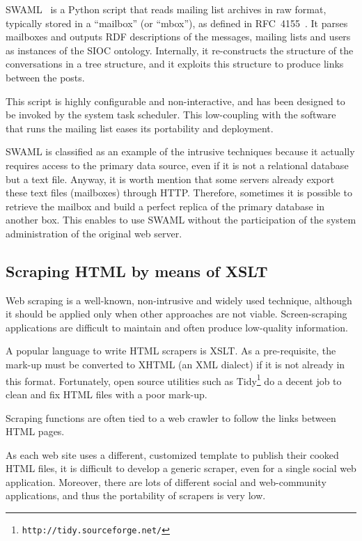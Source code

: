 \documentclass{../templates/www2008-submission}
\begin{document}
SWAML~\cite{SWAML2007} is a Python script that reads mailing 
list archives in raw format, typically stored in a ``mailbox'' 
(or ``mbox''), as defined in RFC~4155~\cite{RFC4155}. It parses
mailboxes and outputs RDF descriptions of the messages, mailing lists
and users as instances of the SIOC ontology. Internally, it re-constructs
the structure of the conversations in a tree structure, and it exploits
this structure to produce links between the posts.

This script is highly configurable and non-interactive, and has been
designed to be invoked by the system task scheduler. This low-coupling with
the software that runs the mailing list eases its portability and
deployment.

SWAML is classified as an example of the intrusive techniques because
it actually requires access to the primary data source, even if
it is not a relational database but a text file. Anyway, it is
worth mention that some servers already export these text files
(mailboxes) through HTTP. Therefore, sometimes it is possible to
retrieve the mailbox and build a perfect replica of the primary
database in another box. This enables to use SWAML without the
participation of the system administration of the original
web server.

\subsection{Scraping HTML by means of XSLT}

Web scraping is a well-known, non-intrusive and widely used technique,
although it should be applied only when other approaches are not viable.
Screen-scraping applications are difficult to maintain and
often produce low-quality information.

A popular language to write HTML scrapers is XSLT. As a pre-requisite,
the mark-up must be converted to XHTML (an XML dialect) if it is not
already in this format. Fortunately, open source utilities such as
Tidy\footnote{\texttt{http://tidy.sourceforge.net/}} do a decent job
to clean and fix HTML files with a poor mark-up.

Scraping functions are often tied to a web crawler to follow the
links between HTML pages.

As each web site uses a different, customized template to
publish their cooked HTML files, it is
difficult to develop a generic scraper, even for a single social
web application. Moreover, there are lots of different social and
web-community applications, and thus the portability of scrapers
is very low.
\end{document}
